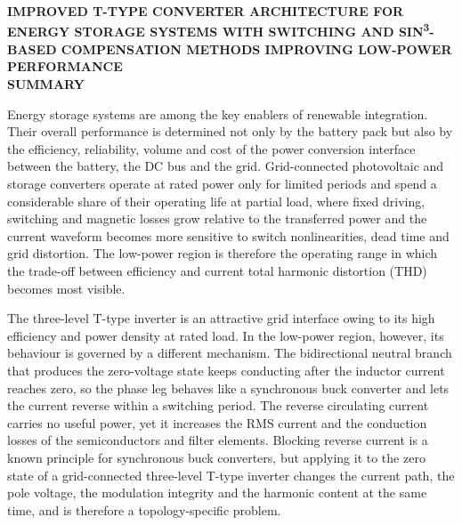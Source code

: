 \cleardoublepage
\thispagestyle{plain}
\begingroup
\singlespacing

\vspace*{72pt}
\begin{center}
  \bfseries IMPROVED T-TYPE CONVERTER ARCHITECTURE FOR ENERGY STORAGE SYSTEMS WITH SWITCHING AND SIN\textsuperscript{3}-BASED COMPENSATION METHODS IMPROVING LOW-POWER PERFORMANCE\\[18pt]
  SUMMARY
\end{center}

Energy storage systems are among the key enablers of renewable integration. Their overall performance is determined not only by the battery pack but also by the efficiency, reliability, volume and cost of the power conversion interface between the battery, the DC bus and the grid. Grid-connected photovoltaic and storage converters operate at rated power only for limited periods and spend a considerable share of their operating life at partial load, where fixed driving, switching and magnetic losses grow relative to the transferred power and the current waveform becomes more sensitive to switch nonlinearities, dead time and grid distortion. The low-power region is therefore the operating range in which the trade-off between efficiency and current total harmonic distortion (THD) becomes most visible.

The three-level T-type inverter is an attractive grid interface owing to its high efficiency and power density at rated load. In the low-power region, however, its behaviour is governed by a different mechanism. The bidirectional neutral branch that produces the zero-voltage state keeps conducting after the inductor current reaches zero, so the phase leg behaves like a synchronous buck converter and lets the current reverse within a switching period. The reverse circulating current carries no useful power, yet it increases the RMS current and the conduction losses of the semiconductors and filter elements. Blocking reverse current is a known principle for synchronous buck converters, but applying it to the zero state of a grid-connected three-level T-type inverter changes the current path, the pole voltage, the modulation integrity and the harmonic content at the same time, and is therefore a topology-specific problem.

